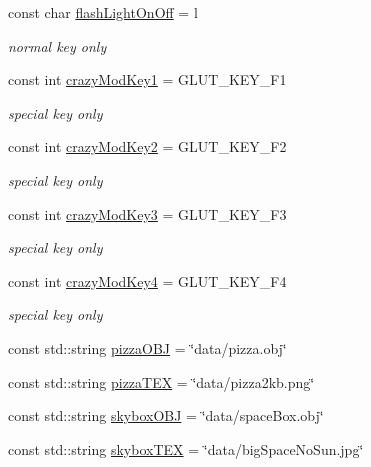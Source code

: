 \begin{DoxyCompactItemize}
const char \mbox{\hyperlink{namespacekrizpav6_a3b8eb3d67a4a849b0ba3e8f3ff05a201}{flash\+Light\+On\+Off}} = \textquotesingle{}l\textquotesingle{}
\begin{DoxyCompactList}\small\item\em normal key only \end{DoxyCompactList}\item 
const int \mbox{\hyperlink{namespacekrizpav6_af7426813619adcf1bf06ea1aad6047cf}{crazy\+Mod\+Key1}} = G\+L\+U\+T\+\_\+\+K\+E\+Y\+\_\+\+F1
\begin{DoxyCompactList}\small\item\em special key only \end{DoxyCompactList}\item 
const int \mbox{\hyperlink{namespacekrizpav6_ad48c2439fa0c82463864ed1bcff4f40e}{crazy\+Mod\+Key2}} = G\+L\+U\+T\+\_\+\+K\+E\+Y\+\_\+\+F2
\begin{DoxyCompactList}\small\item\em special key only \end{DoxyCompactList}\item 
const int \mbox{\hyperlink{namespacekrizpav6_a43aaafe544f5bfc95f60837f766a575c}{crazy\+Mod\+Key3}} = G\+L\+U\+T\+\_\+\+K\+E\+Y\+\_\+\+F3
\begin{DoxyCompactList}\small\item\em special key only \end{DoxyCompactList}\item 
const int \mbox{\hyperlink{namespacekrizpav6_ab797d7d4d2f5f018ca3847126c8ec899}{crazy\+Mod\+Key4}} = G\+L\+U\+T\+\_\+\+K\+E\+Y\+\_\+\+F4
\begin{DoxyCompactList}\small\item\em special key only \end{DoxyCompactList}\item 
const std\+::string \mbox{\hyperlink{namespacekrizpav6_ae82fd1b60a54fc4f52cd6dc4136a1a55}{pizza\+O\+BJ}} = \char`\"{}data/pizza.\+obj\char`\"{}
\item 
const std\+::string \mbox{\hyperlink{namespacekrizpav6_aa8ed1c4d17d6d0e20156f492a95d36dc}{pizza\+T\+EX}} = \char`\"{}data/pizza2kb.\+png\char`\"{}
\item 
const std\+::string \mbox{\hyperlink{namespacekrizpav6_a24081d2a485474536a25a8fc42a0907e}{skybox\+O\+BJ}} = \char`\"{}data/space\+Box.\+obj\char`\"{}
\item 
const std\+::string \mbox{\hyperlink{namespacekrizpav6_a3ddb1812e5410279d7e2d9b1bb3f95a1}{skybox\+T\+EX}} = \char`\"{}data/big\+Space\+No\+Sun.\+jpg\char`\"{}

\end{DoxyCompactItemize}

